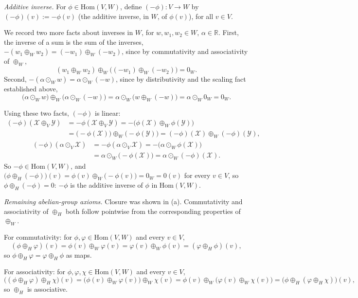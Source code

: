 \documentclass[11pt]{article}
\begin{document}
\emph{Additive inverse.} For $\phi\in\mathrm{Hom}(V,W)$, define $(-\phi):V\to W$ by $(-\phi)(v):=-\phi(v)$ (the additive inverse, in $W$, of $\phi(v)$), for all $v\in V$.

We record two more facts about inverses in $W$, for $w,w_1,w_2\in W$, $\alpha\in\mathbb R$. First, the inverse of a sum is the sum of the inverses, $-(w_1\oplus_Ww_2)=(-w_1)\oplus_W(-w_2)$, since by commutativity and associativity of $\oplus_W$,
\[
(w_1\oplus_Ww_2)\oplus_W\big((-w_1)\oplus_W(-w_2)\big)=0_W.
\]
Second, $-(\alpha\odot_Ww)=\alpha\odot_W(-w)$, since by distributivity and the scaling fact established above,
\[
\big(\alpha\odot_Ww\big)\oplus_W\big(\alpha\odot_W(-w)\big)=\alpha\odot_W\big(w\oplus_W(-w)\big)=\alpha\odot_W0_W=0_W.
\]

Using these two facts, $(-\phi)$ is linear:
\begin{align*}
(-\phi)(\mathcal X\oplus_V\mathcal Y) &= -\phi(\mathcal X\oplus_V\mathcal Y) = -\big(\phi(\mathcal X)\oplus_W\phi(\mathcal Y)\big) \\
&= \big(-\phi(\mathcal X)\big)\oplus_W\big(-\phi(\mathcal Y)\big) = (-\phi)(\mathcal X)\oplus_W(-\phi)(\mathcal Y),
\end{align*}
\begin{align*}
(-\phi)(\alpha\odot_V\mathcal X) &= -\phi(\alpha\odot_V\mathcal X) = -\big(\alpha\odot_W\phi(\mathcal X)\big) \\
&= \alpha\odot_W\big(-\phi(\mathcal X)\big) = \alpha\odot_W(-\phi)(\mathcal X).
\end{align*}
So $-\phi\in\mathrm{Hom}(V,W)$, and $\big(\phi\oplus_H(-\phi)\big)(v)=\phi(v)\oplus_W\big(-\phi(v)\big)=0_W=0(v)$ for every $v\in V$, so $\phi\oplus_H(-\phi)=0$: $-\phi$ is the additive inverse of $\phi$ in $\mathrm{Hom}(V,W)$.

\emph{Remaining abelian-group axioms.} Closure was shown in (a). Commutativity and associativity of $\oplus_H$ both follow pointwise from the corresponding properties of $\oplus_W$.

For commutativity: for $\phi,\varphi\in\mathrm{Hom}(V,W)$ and every $v\in V$,
\[
(\phi\oplus_H\varphi)(v)=\phi(v)\oplus_W\varphi(v)=\varphi(v)\oplus_W\phi(v)=(\varphi\oplus_H\phi)(v),
\]
so $\phi\oplus_H\varphi=\varphi\oplus_H\phi$ as maps.

For associativity: for $\phi,\varphi,\chi\in\mathrm{Hom}(V,W)$ and every $v\in V$,
\[
\big((\phi\oplus_H\varphi)\oplus_H\chi\big)(v)=\big(\phi(v)\oplus_W\varphi(v)\big)\oplus_W\chi(v)=\phi(v)\oplus_W\big(\varphi(v)\oplus_W\chi(v)\big)=\big(\phi\oplus_H(\varphi\oplus_H\chi)\big)(v),
\]
so $\oplus_H$ is associative.
\end{document}
